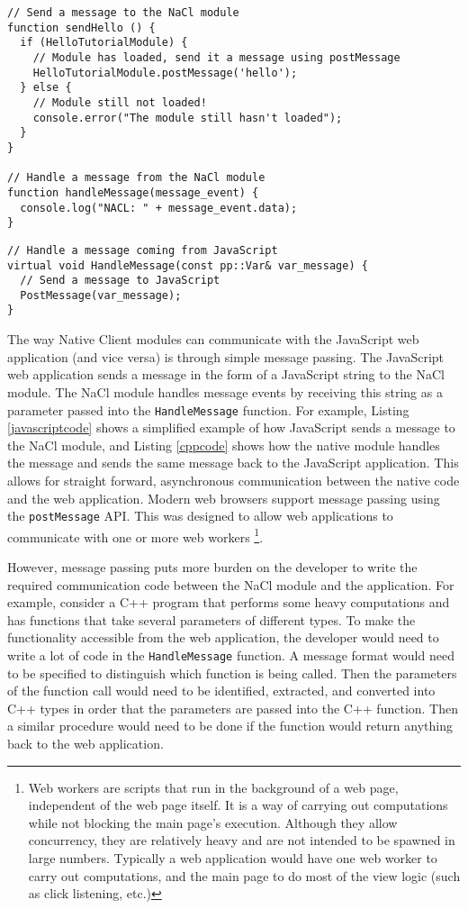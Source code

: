 \begin{lstlisting}
// Send a message to the NaCl module
function sendHello () {
  if (HelloTutorialModule) {
    // Module has loaded, send it a message using postMessage
    HelloTutorialModule.postMessage('hello');
  } else {
    // Module still not loaded!
    console.error("The module still hasn't loaded");
  }
}

// Handle a message from the NaCl module
function handleMessage(message_event) {
  console.log("NACL: " + message_event.data);
}
\end{lstlisting}


\begin{lstlisting}
// Handle a message coming from JavaScript
virtual void HandleMessage(const pp::Var& var_message) {
  // Send a message to JavaScript
  PostMessage(var_message);
}
\end{lstlisting}

The way Native Client modules can communicate with the JavaScript web application (and vice versa) is through simple message passing. The JavaScript web application sends a message in the form of a JavaScript string to the NaCl module. The NaCl module handles message events by receiving this string as a parameter passed into the \lstinline+HandleMessage+ function. For example, Listing \ref{javascriptcode} shows a simplified example of how JavaScript sends a message to the NaCl module, and Listing \ref{cppcode} shows how the native module handles the message and sends the same message back to the JavaScript application. This allows for straight forward, asynchronous communication between the native code and the web application. Modern web browsers support message passing using the \lstinline+postMessage+ API. This was designed to allow web applications to communicate with one or more web workers
\footnote{Web workers\cite{webworkersw3c} are scripts that run in the background of a web page, independent of the web page itself. It is a way of carrying out computations while not blocking the main page's execution. Although they allow concurrency, they are relatively heavy and are not intended to be spawned in large numbers. Typically a web application would have one web worker to carry out computations, and the main page to do most of the view logic (such as click listening, etc.)}. 

However, message passing puts more burden on the developer to write the required communication code between the NaCl module and the application. For example, consider a C++ program that performs some heavy computations and has functions that take several parameters of different types. To make the functionality accessible from the web application, the developer would need to write a lot of code in the \lstinline+HandleMessage+ function. A message format would need to be specified to distinguish which function is being called. Then the parameters of the function call would need to be identified, extracted, and converted into C++ types in order that the parameters are passed into the C++ function. Then a similar procedure would need to be done if the function would return anything back to the web application. 

